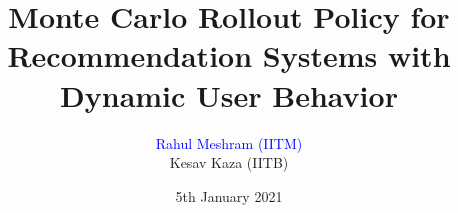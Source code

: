 \documentclass{beamer}
\title{Monte Carlo Rollout Policy for Recommendation Systems with Dynamic User Behavior}
\author{ \textcolor{blue}{Rahul Meshram (IITM)}  \\
Kesav Kaza (IITB) }
\institute{COMSNETS 2021, Bangalore}
\date{ 5th January 2021}
\begin{document}
\newcommand{\iid}{{i.i.d.}}
\newcommand{\prob}[1]{\mathsf{Pr}\left( #1 \right)}
\newcommand{\remove}[1]{}
\newcommand{\rahul}[1]{\textbf{RAHUL SHOULD FILL THIS/DISCUSS}: \textcolor{blue}{#1}}
\newcommand{\comments}[1]{}
\newcommand{\selfnote}[1]{\textcolor{blue}{\textbf{Note to self:}
    {#1}}}
\newcommand{\defn}{{\stackrel{\triangle}{=}}}
\newcommand{\pd}[2]{\frac{ \partial #1}{\partial #2}}
\newcommand{\md}[2]{\frac{ \partial^2 #1}{\partial #2^2}}
\newcommand{\expect}[1]{\mathsf{E}\left({#1}\right)}
\newcommand{\given}{\; \big\vert \;} 
\newcommand{\bydef}{:=}
\newcommand{\ip}[2]{\langle #1,#2 \rangle}
\newcommand{\todo}[1]{\begin{color}{blue}{{\bf~[TODO:~#1]}}\end{color}}





\newcommand{\bit}{\begin{itemize}}
\newcommand{\eit}{\end{itemize}}
\newcommand{\beqn}{\[}
\newcommand{\eeqn}{\]}

\newcommand{\eean}{\end{eqnarray*}}
\newcommand{\re}{\mbox{$\mathfrak{Re}$}}
\newcommand{\no}{\nonumber}
\newcommand{\ben}{\begin{enumerate}}
\newcommand{\een}{\end{enumerate}}
\newcommand{\bc}{\begin{center}}
\newcommand{\ec}{\end{center}}

\newcommand{\blem}{\begin{lemma}}
\newcommand{\elem}{\end{lemma}}
\newcommand{\bthm}{\begin{theorem}}
\newcommand{\ethm}{\end{theorem}}
\newcommand{\bdefn}{\begin{definition}}
\newcommand{\edefn}{\end{definition}}
\newcommand{\bpf}{\begin{proof}}
\newcommand{\epf}{\end{proof}}
\end{document}

